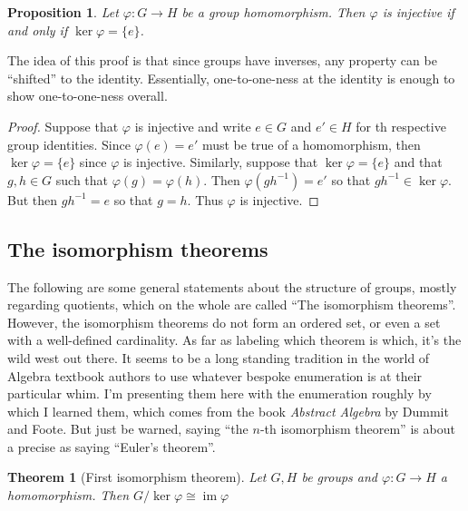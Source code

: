 \documentclass[12pt]{article}
\numberwithin{equation}{subsection}
\newtheorem{thm}[subsection]{Theorem}
\newtheorem{prop}[subsection]{Proposition}
\theoremstyle{note}
\newcommand{\img}{\operatorname{im}}
\begin{document}
\begin{prop}
	Let $\varphi\colon G\to H$ be a group homomorphism. Then $\varphi$ is injective if and only if $\ker\varphi=\{e\}$.
\end{prop}

The idea of this proof is that since groups have inverses, any property can be ``shifted'' to the identity. Essentially, one-to-one-ness at the identity is enough to show one-to-one-ness overall. 

\begin{proof}
Suppose that $\varphi$ is injective and write $e\in G$ and $e'\in H$ for th respective group identities. Since $\varphi(e)=e'$ must be true of a homomorphism, then $\ker\varphi=\{e\}$ since $\varphi$ is injective. 
	Similarly, suppose that $\ker\varphi=\{e\}$ and that $g,h\in G$ such that $\varphi(g)=\varphi(h)$. Then $\varphi(gh^{-1})=e'$ so that $gh^{-1}\in \ker\varphi$. But then $gh^{-1}=e$ so that $g=h$. Thus $\varphi$ is injective.
\end{proof}

\subsection{The isomorphism theorems}

The following are some general statements about the structure of groups, mostly regarding quotients, which on the whole are called ``The isomorphism theorems''. However, the isomorphism theorems do not form an ordered set, or even a set with a well-defined cardinality.  As far as labeling which theorem is which, it's the wild west out there. It seems to be a long standing tradition in the world of Algebra textbook authors to use whatever bespoke enumeration is at their particular whim. I'm presenting them here with the enumeration roughly by which I learned them, which comes from the book \textit{Abstract Algebra} by Dummit and Foote. But just be warned, saying ``the $n$-th isomorphism theorem'' is about a precise as saying ``Euler's theorem''. 

\begin{thm}[First isomorphism theorem] \label{first-iso}
	Let $G,H$ be groups and $\varphi\colon G\to H$ a homomorphism. Then $G/\ker{\varphi}\cong \img{\varphi}$
\end{thm}
\end{document}
